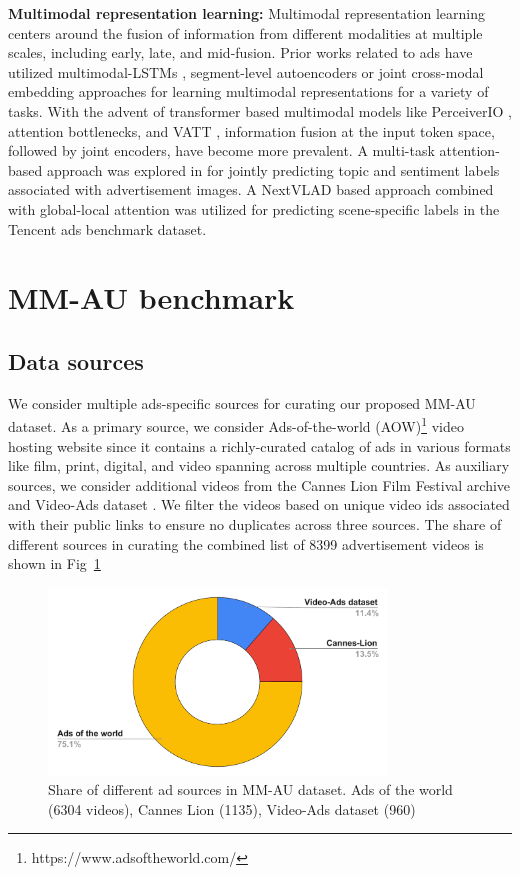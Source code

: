 \textbf{Multimodal representation learning:} Multimodal representation learning \cite{Liang2022FoundationsAR} centers around the fusion of information from different modalities at multiple scales, including early, late, and mid-fusion. Prior works related to ads have utilized multimodal-LSTMs \cite{Vedula2017MultimodalCA}, segment-level autoencoders \cite{SomandepJointenc} or joint cross-modal embedding \cite{Ye2019InterpretingTR} approaches for learning multimodal representations for a variety of tasks. With the advent of transformer \cite{transformers} based multimodal models like PerceiverIO \cite{Jaegle2021PerceiverIA}, attention bottlenecks\cite{nagrani2021attention}, and VATT \cite{Akbari2021VATTTF}, information fusion at the input token space, followed by joint encoders, have become more prevalent. A multi-task attention-based approach was explored in \cite{LookReadFeel} for jointly predicting topic and sentiment labels associated with advertisement images. A NextVLAD \cite{Lin2018NeXtVLADAE} based approach \cite{Weng2021AMF} combined with global-local attention was utilized for predicting scene-specific labels in the Tencent \cite{Jiang2022TencentAA} ads benchmark dataset.
\section{MM-AU benchmark}
\subsection{Data sources}
We consider multiple ads-specific sources for curating our proposed MM-AU dataset. As a primary source, we consider Ads-of-the-world (AOW)\footnote{https://www.adsoftheworld.com/} video hosting website since it contains a richly-curated catalog of ads in various formats like film, print, digital, and video spanning across multiple countries. As auxiliary sources, we consider additional videos from the Cannes Lion Film Festival archive and Video-Ads dataset \cite{Hussain2017AutomaticUO}. We filter the videos based on unique video ids associated with their public links to ensure no duplicates across three sources. The share of different sources in curating the combined list of 8399 advertisement videos is shown in Fig~\ref{ads_sources}
\begin{figure}[h!]
    \centering
    \includegraphics[width=0.8\textwidth]{figures/data_sources_distribution.pdf}
    \caption{Share of different ad sources in MM-AU dataset. Ads of the world (6304 videos), Cannes Lion (1135), Video-Ads dataset (960) }
    \label{ads_sources}
\end{figure}


